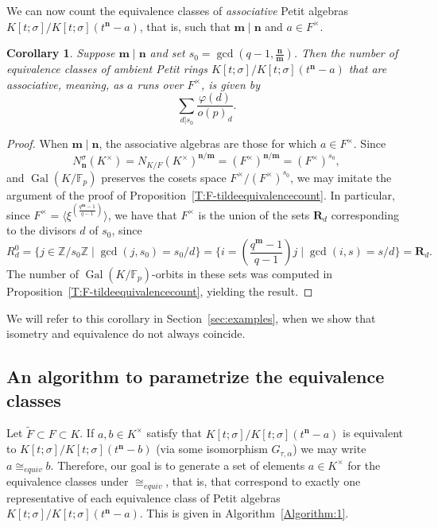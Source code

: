 \documentclass[11pt]{amsart}
\theoremstyle{plain}
\newtheorem{corollary}[theorem]{Corollary}
\theoremstyle{definition}
\numberwithin{equation}{section}
\numberwithin{figure}{section}
\newcommand{\ZZ}{\mathbb{Z}}
\newcommand{\FF}{\mathbb{F}}
\newcommand{\Kone}[1]{K[t;\sigma]/K[t;\sigma](t^{\de}-#1)}
\newcommand{\os}{{\mathbf{m}}}  %
\newcommand{\de}{{\mathbf{n}}}  %
\DeclareMathOperator{\Gal}{Gal}
\begin{document}
We can now count the equivalence classes of \emph{associative} Petit algebras $\Kone{a}$, that is, such that $\os\mid\de$ and $a\in F^\times$.

\begin{corollary}\label{Cor:associativecase}
    Suppose $\os\mid \de$ and set $s_0 = \gcd(q-1,\frac{\de}{\os})$. Then the number of equivalence classes of ambient Petit rings $\Kone{a}$ that are \emph{associative}, meaning, as $a$ runs over $F^\times$, is given by
    $$
    \sum_{d|s_0}\frac{\varphi(d)}{o(p)_d}.
    $$
\end{corollary}

\begin{proof}
    When $\os\mid\de$, the associative algebras are those for which $a\in F^\times$.  Since
    $$N_\de^\sigma(K^\times) = N_{K/F}(K^\times)^{\de/\os}=(F^\times)^{\de/\os}=(F^\times)^{s_0},
    $$
    and $\Gal(K/\FF_p)$ preserves the cosets space $F^\times/(F^\times)^{s_0}$, we may imitate the argument of the proof of Proposition~\ref{T:F-tildeequivalencecount}.  In particular, since $F^\times = \langle \xi^{\left(\frac{q^\os-1}{q-1}\right)}\rangle$, we have that $F^\times$ is the union of the sets $\mathbf{R}_d$ corresponding to the divisors $d$ of $s_0$, since
    $$R^0_d=\{j\in \ZZ/s_0\ZZ \mid \gcd(j,s_0)=s_0/d\}= \{i=\left(\frac{q^\os-1}{q-1}\right)j\mid \gcd(i,s)=s/d\}=\mathbf{R}_d.$$
    The number of $\Gal(K/\FF_p)$-orbits in these sets was computed in Proposition~\ref{T:F-tildeequivalencecount}, yielding the result.
\end{proof}


We will refer to this corollary in Section~\ref{sec:examples}, when we show that isometry and equivalence do not always coincide.

\subsection{An algorithm to parametrize
the equivalence classes}

Let $\tilde{F}\subset F\subset K$.
If $a,b\in K^\times$ satisfy that $\Kone{a}$ is equivalent to $\Kone{b}$ (via some isomorphism $G_{\tau,\alpha}$) we may write $a\cong_{equiv} b$.  Therefore, our goal is to generate
a set of elements $a\in K^\times$ for the equivalence classes under $\cong_{equiv}$, that is, that correspond to exactly one representative of each equivalence class of Petit algebras $K[t;\sigma]/K[t;\sigma](t^\de-a)$.  This is given in Algorithm~\ref{Algorithm:1}.
\end{document}
